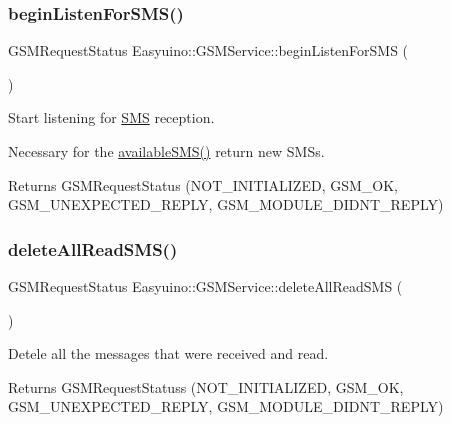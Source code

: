\subsubsection{\texorpdfstring{begin\+Listen\+For\+S\+M\+S()}{beginListenForSMS()}}
{\footnotesize\ttfamily G\+S\+M\+Request\+Status Easyuino\+::\+G\+S\+M\+Service\+::begin\+Listen\+For\+S\+MS (\begin{DoxyParamCaption}{ }\end{DoxyParamCaption})}



Start listening for \hyperlink{class_easyuino_1_1_s_m_s}{S\+MS} reception. 

Necessary for the \hyperlink{class_easyuino_1_1_g_s_m_service_a02c2bddace1c87f035f324ae248c4f1d}{available\+S\+M\+S()} return new S\+M\+Ss. \begin{DoxyReturn}{Returns}
G\+S\+M\+Request\+Status (N\+O\+T\+\_\+\+I\+N\+I\+T\+I\+A\+L\+I\+Z\+ED, G\+S\+M\+\_\+\+OK, G\+S\+M\+\_\+\+U\+N\+E\+X\+P\+E\+C\+T\+E\+D\+\_\+\+R\+E\+P\+LY, G\+S\+M\+\_\+\+M\+O\+D\+U\+L\+E\+\_\+\+D\+I\+D\+N\+T\+\_\+\+R\+E\+P\+LY) 
\end{DoxyReturn}
\mbox{\label{class_easyuino_1_1_g_s_m_service_af142e4f7d99cffda9a3598446466cdb3}} 
\subsubsection{\texorpdfstring{delete\+All\+Read\+S\+M\+S()}{deleteAllReadSMS()}}
{\footnotesize\ttfamily G\+S\+M\+Request\+Status Easyuino\+::\+G\+S\+M\+Service\+::delete\+All\+Read\+S\+MS (\begin{DoxyParamCaption}{ }\end{DoxyParamCaption})}



Detele all the messages that were received and read. 

\begin{DoxyReturn}{Returns}
G\+S\+M\+Request\+Statuss (N\+O\+T\+\_\+\+I\+N\+I\+T\+I\+A\+L\+I\+Z\+ED, G\+S\+M\+\_\+\+OK, G\+S\+M\+\_\+\+U\+N\+E\+X\+P\+E\+C\+T\+E\+D\+\_\+\+R\+E\+P\+LY, G\+S\+M\+\_\+\+M\+O\+D\+U\+L\+E\+\_\+\+D\+I\+D\+N\+T\+\_\+\+R\+E\+P\+LY) 
\end{DoxyReturn}
\mbox{\label{class_easyuino_1_1_g_s_m_service_a7b457ab0669a8e9c16ab1906cc246365}} 
